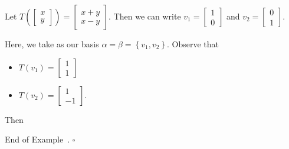 \documentclass[10pt]{article}
\theoremstyle{definition}
\newtheorem{example}[theorem]{Example}
\renewenvironment{example}
{\begin{oldexample}}
  {\par\smallskip\hfill   End of Example~\theexample. $\square$    \par\end{oldexample}}
\begin{document}
\begin{example}
  Let $T
  \left(\begin{bmatrix}
      x\\y
    \end{bmatrix}
  \right) =
  \begin{bmatrix}
    x+y\\x-y
  \end{bmatrix}
  $.
  Then we can write $v_{1} =
  \begin{bmatrix}
    1\\0
  \end{bmatrix}
  $
  and $v_{2} =
  \begin{bmatrix}
    0\\1
  \end{bmatrix}
  $.

  Here, we take as our basis $\alpha=\beta=\left\{v_{1},v_{2}\right\}$.
  Observe that
  \begin{itemize}
    \item $T(v_{1})=
    \begin{bmatrix}
      1\\1
    \end{bmatrix}
    $
    \item $T(v_{2})=
    \begin{bmatrix}
      1\\-1
    \end{bmatrix}
    $.
  \end{itemize}
  Then
  \newcommand*{\vertbar}{\rule[-1ex]{0.5pt}{2.5ex}}
  \newcommand*{\horzbar}{\,\rule[.5ex]{2.5ex}{0.5pt}\,}


\end{example}
\end{document}
